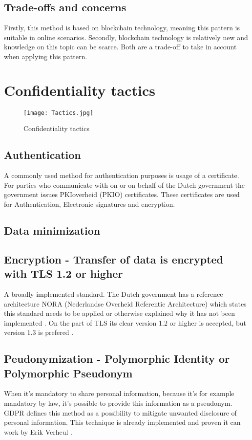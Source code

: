 \subsection{Trade-offs and concerns}
Firstly, this method is based on blockchain technology, meaning this pattern is suitable in online scenarios. Secondly, blockchain technology is relatively new and knowledge on this topic can be scarce. Both are a trade-off to take in account when applying this pattern. 

\section{Confidentiality tactics}
\graphicspath{ {./images/} }
\begin{figure}[t]
\centering
\label{fig:Tactics}
\texttt{[image: Tactics.jpg]}\\
\caption{Confidentiality tactics}
\end{figure}

\subsection{Authentication}
A commonly used method for authentication purposes is usage of a certificate. For parties who communicate with on or on behalf of the Dutch government the government issues PKIoverheid (PKIO) certificates. These certificates are used for Authentication, Electronic signatures and encryption. \cite{Logius_PKIO}

\subsection{Data minimization}
\lipsum[1-1]

\subsection{Encryption - Transfer of data is encrypted with TLS 1.2 or higher}
A broadly implemented standard. The Dutch government has a reference architecture NORA (Nederlandse Overheid Referentie Architecture) \cite{NORA} which states this standard needs to be applied or otherwise explained why it has not been implemented \cite{NORA_PasToeOfLegUit}. On the part of TLS its clear version 1.2 or higher is accepted, but version 1.3 is prefered \cite{NORA_TLS}. 

\subsection{Peudonymization - Polymorphic Identity or Polymorphic Pseudonym}
When it's mandatory to share personal information, because it's for example mandatory by law, it's possible to provide this information as a pseudonym. GDPR \cite{GDPR} defines this method as a possibility to mitigate unwanted disclosure of personal information. 
This technique is already implemented and proven it can work by Erik Verheul \cite{VerheuleID}.


